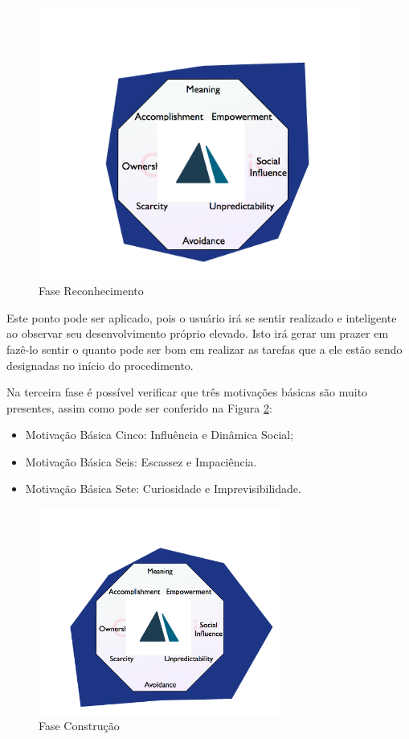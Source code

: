\begin{figure}[h]
    \centering
    \includegraphics[width=400px, scale=1]{figuras/fasereconhecimento}
    \caption{Fase Reconhecimento}
    \label{fig:fasereconhecimento}
\end{figure}

Este ponto pode ser aplicado, pois o usuário irá se sentir realizado e inteligente
ao observar seu desenvolvimento próprio elevado. Isto irá gerar um prazer em fazê-lo
sentir o quanto pode ser bom em realizar as tarefas que a ele estão sendo designadas
no início do procedimento.

Na terceira fase é possível verificar que três motivações básicas são muito presentes,
assim como pode ser conferido na Figura \ref{fig:faseconstrucao}:



\begin{itemize}
    \item Motivação Básica Cinco: Influência e Dinâmica Social;
    \item Motivação Básica Seis: Escassez e Impaciência.
    \item Motivação Básica Sete: Curiosidade e Imprevisibilidade.
\end{itemize}

\begin{figure}[h]
    \centering
    \includegraphics[width=300px, scale=1]{figuras/faseconstrucao}
    \caption{Fase Construção}
    \label{fig:faseconstrucao}
\end{figure}


